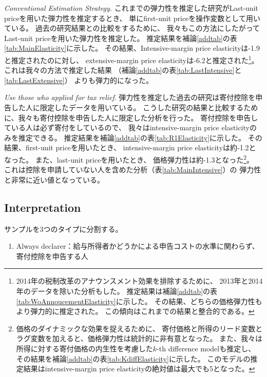 \documentclass[
  11pt,
  a4paper,
]{article}
\providecommand{\tightlist}{%
  \setlength{\itemsep}{0pt}\setlength{\parskip}{0pt}}
\begin{document}
\noindent
\emph{Conventional Estimation Strategy.}
これまでの弾力性を推定した研究がLast-unit priceを用いた弾力性を推定するとき、
単にfirst-unit priceを操作変数として用いている。
過去の研究結果との比較をするために、
我々もこの方法にしたがってLast-unit priceを用いた弾力性を推定した。
推定結果を補論\ref{addtab}の表\ref{tab:MainElasticity}に示した。
その結果、Intensive-margin price elasticityは-1.9と推定されたのに対し、
extensive-margin price elasticityは-6.2と推定された\footnote{2014年の税制改革のアナウンスメント効果を排除するために、
  2013年と2014年のデータを除いた分析もした。
  推定結果は補論\ref{addtab}の表\ref{tab:WoAnnoucementElasticity}に示した。
  その結果、どちらの価格弾力性もより弾力的に推定された。
  この傾向はこれまでの結果と整合的である。}。
これは我々の方法で推定した結果
（補論\ref{addtab}の表\ref{tab:LastIntensive}と\ref{tab:LastExtensive}）
よりも弾力的になった。

\noindent
\emph{Use those who applied for tax relief}.
弾力性を推定した過去の研究は寄付控除を申告した人に限定したデータを用いている。
こうした研究の結果と比較するために、我々も寄付控除を申告した人に限定した分析を行った。
寄付控除を申告している人は必ず寄付をしているので、
我々はintensive-margin price elasticityのみを推定できる。
推定結果を補論\ref{addtab}の表\ref{tab:R1Elasticity}に示した。
その結果、first-unit priceを用いたとき、
intensive-margin price elasticityは約-1.2となった。
また、last-unit priceを用いたとき、
価格弾力性は約-1.3となった\footnote{価格のダイナミックな効果を捉えるために、
  寄付価格と所得のリード変数とラグ変数を加えると、価格弾力性は統計的に非有意となった。
  また、我々は所得に対する寄付価格の内生性を考慮した\(k\)-th difference modelも推定し、
  その結果を補論\ref{addtab}の表\ref{tab:KdiffElasticity}に示した。
  このモデルの推定結果はintensive-margin price elasticityの絶対値は最大でも5となった。}。
これは控除を申請していない人を含めた分析（表\ref{tab:MainIntensive}）の
弾力性と非常に近い値となっている。

\hypertarget{interpretation}{%
\subsection{Interpretation}\label{interpretation}}

サンプルを3つのタイプに分割する。

\begin{enumerate}
\def\labelenumi{\arabic{enumi}.}
\tightlist
\item
  Always declarer：給与所得者かどうかによる申告コストの水準に関わらず、寄付控除を申告する人
\end{enumerate}
\end{document}
